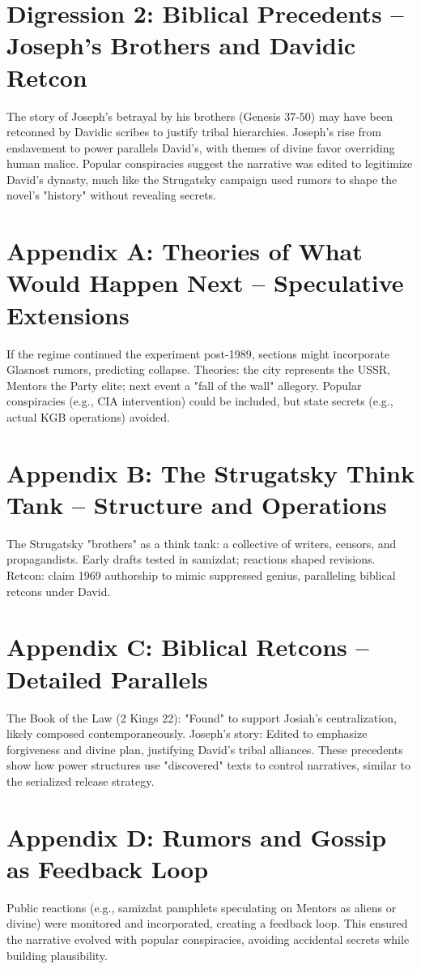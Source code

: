 \documentclass[openany]{book}
\begin{document}
\section{Digression 2: Biblical Precedents – Joseph's Brothers and Davidic Retcon}
The story of Joseph's betrayal by his brothers (Genesis 37-50) may have been retconned by Davidic scribes to justify tribal hierarchies. Joseph's rise from enslavement to power parallels David's, with themes of divine favor overriding human malice. Popular conspiracies suggest the narrative was edited to legitimize David's dynasty, much like the Strugatsky campaign used rumors to shape the novel's "history" without revealing secrets.

\section{Appendix A: Theories of What Would Happen Next – Speculative Extensions}
If the regime continued the experiment post-1989, sections might incorporate Glasnost rumors, predicting collapse. Theories: the city represents the USSR, Mentors the Party elite; next event a "fall of the wall" allegory. Popular conspiracies (e.g., CIA intervention) could be included, but state secrets (e.g., actual KGB operations) avoided.

\section{Appendix B: The Strugatsky Think Tank – Structure and Operations}
The Strugatsky "brothers" as a think tank: a collective of writers, censors, and propagandists. Early drafts tested in samizdat; reactions shaped revisions. Retcon: claim 1969 authorship to mimic suppressed genius, paralleling biblical retcons under David.

\section{Appendix C: Biblical Retcons – Detailed Parallels}
The Book of the Law (2 Kings 22): "Found" to support Josiah's centralization, likely composed contemporaneously. Joseph's story: Edited to emphasize forgiveness and divine plan, justifying David's tribal alliances. These precedents show how power structures use "discovered" texts to control narratives, similar to the serialized release strategy.

\section{Appendix D: Rumors and Gossip as Feedback Loop}
Public reactions (e.g., samizdat pamphlets speculating on Mentors as aliens or divine) were monitored and incorporated, creating a feedback loop. This ensured the narrative evolved with popular conspiracies, avoiding accidental secrets while building plausibility.
\end{document}
